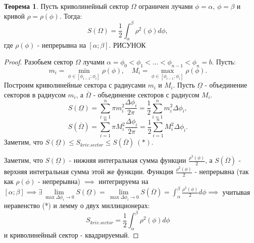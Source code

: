 \documentclass{report}
\theoremstyle{definition}
\newtheorem{theorem}{Теорема}[section]
\begin{document}
\begin{theorem}
  Пусть криволинейный сектор $\Omega$ ограничен лучами $\phi = \alpha, \ \phi = \beta$ и кривой $\rho
    = \rho(\phi)$. Тогда:
  \begin{equation*}
    S(\Omega) = \frac{1}{2}\int_{\alpha}^{\beta}\rho^2(\phi)d\phi,
  \end{equation*}
  где $\rho(\phi)$ - непрерывна на $[\alpha;\beta]$. {\Large РИСУНОК}
\end{theorem}
\begin{proof}
  Разобьем сектор $\Omega$ лучами $\alpha = \phi_0<\phi_1<\ldots<\phi_{n-1}<\phi_n=b$. Пусть:
  \begin{equation*}
    m_i = \underset{\phi\in[\phi_{i-1};\phi_i]}{\min}\rho(\phi), \quad M_i = \underset
    {\phi\in[\phi_{i-1};\phi_i]}{\max}\rho(\phi).
  \end{equation*}
  Построим криволинейные сектора с радиусами $m_i$ и $M_i$. Пусть $\underline{\Omega}$ - объединение
  секторов в радиусом $m_i$, а $\overline{\Omega}$ - объединение секторов с радиусом $M_i$.
  \begin{equation*}
    S(\underline{\Omega}) = \sum_{i=1}^{n}\pi m_i^2\frac{\Delta\phi_i}{2\pi}=\frac{1}{2}\sum_{i=1}^{n}
    m_i^2\Delta \phi_i,
  \end{equation*}
  \begin{equation*}
    S(\overline{\Omega}) = \sum_{i=1}^{n}\pi M_i^2\frac{\Delta\phi_i}{2\pi}=\frac{1}{2}\sum_{i=1}^{n}
    M_i^2\Delta \phi_i.
  \end{equation*}
  Заметим, что $S(\underline{\Omega})\leqslant S_{kriv.sector} \leqslant S(\overline{\Omega}) \ (*)$.

  Заметим, что $S(\underline{\Omega})$ - нижняя интегральная сумма функции $\frac{\rho^2(\phi)}{2}$,
  а $S(\overline{\Omega})$ - верхняя интегральная сумма этой же функции. Функция $\frac{\rho^2(\phi)}{2}$
  - непрерывна (так как $\rho(\phi)$ - непрерывна) $\implies$ интегрируема на $[\alpha;\beta] \implies
    \exists \underset{\max\Delta \phi_i\rightarrow0}{\lim}S(\underline{\Omega}) =
    \underset{\max\Delta \phi_i\rightarrow0}{\lim}S(\overline{\Omega}) = \int_{\alpha}^{\beta}\frac{\rho^2(\phi)}
    {2}d\phi \implies$ учитывая неравенство (*) и лемму о двух миллиционерах:
  \begin{equation*}
    S_{kriv.sector} = \frac{1}{2}\int_{\alpha}^{\beta}\rho^2(\phi)d\phi
  \end{equation*}
  и криволинейный сектор - квадрируемый.
\end{proof}
\end{document}
